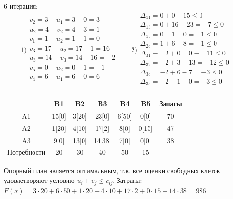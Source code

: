 \documentclass[a4paper, 12pt]{article}
\begin{document}
6-итерация:\\
\begin{equation*}
  1)\begin{split}
    v_2= 3 - u_1 = 3-0 = 3\\
    u_2= 4 - v_2 = 4-3 = 1\\
    v_1= 1 - u_2 = 1-1 = 0\\
    v_3= 17 - u_2 = 17-1 = 16\\
    u_3= 14 - v_3 = 14-16 = -2\\
    v_5= 0 - u_2 = 0-1 = -1\\
    v_4= 6 - u_1 = 6-0 = 6\\
  \end{split}
  \qquad  
  2)\begin{split}
    \Delta_{11} = 0+0-15 \leq 0 \\
    \Delta_{13} = 0+16-23 = -7 \leq 0 \\
    \Delta_{15} = 0-1-0 = -1 \leq 0 \\
    \Delta_{24} = 1+6-8 = -1 \leq 0 \\
    \Delta_{31} = -2+0-0 = -11 \leq 0 \\
    \Delta_{32} = -2+3-13 = -12 \leq 0 \\
    \Delta_{34} = -2+6-7 = -3 \leq 0 \\
    \Delta_{35} = -2-1-0 = -3 \leq 0 \\
  \end{split}
\end{equation*}

\begin{table}[H]
\centering
\begin{tabular}{|c|c|c|c|c|c|c|}
\hline
     & B1       & B2       & B3        & B4        & B5        & Запасы \\ \hline
A1   & 15[0]    & 3[20]    & 23[0]     & 6[50]     & 0[0]      & 70     \\ \hline
A2   & 1[20]    & 4[10]    & 17[2]     & 8[0]      & 0[15]     & 47     \\ \hline
A3   & 9[0]     & 13[0]    & 14[38]    & 7[0]      & 0[0]      & 38     \\ \hline
Потребности & 20       & 30       & 40        & 50        & 15        &        \\ \hline
\end{tabular}
\end{table}

Опорный план является оптимальным, т.к. все оценки свободных клеток удовлетворяют условию $u_i+v_j\leq c_{ij}$. Затраты: $F(x)=3\cdot20+6\cdot50+1\cdot20+4\cdot10+17\cdot2+0\cdot15+14\cdot38 = 986$
\end{document}

